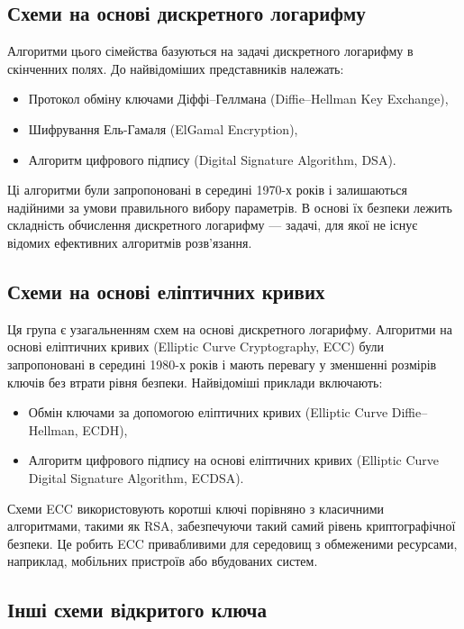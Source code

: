 \documentclass[12pt]{report}
\begin{document}
\subsection{Схеми на основі дискретного логарифму}

Алгоритми цього сімейства базуються на задачі дискретного логарифму в скінченних полях. До найвідоміших представників належать:
\begin{itemize}
    \item Протокол обміну ключами Діффі–Геллмана (Diffie–Hellman Key Exchange),
    \item Шифрування Ель-Гамаля (ElGamal Encryption),
    \item Алгоритм цифрового підпису (Digital Signature Algorithm, DSA).
\end{itemize}

Ці алгоритми були запропоновані в середині 1970-х років і залишаються надійними за умови правильного вибору параметрів. В основі їх безпеки лежить складність обчислення дискретного логарифму — задачі, для якої не існує відомих ефективних алгоритмів розв’язання.

\subsection{Схеми на основі еліптичних кривих}

Ця група є узагальненням схем на основі дискретного логарифму. Алгоритми на основі еліптичних кривих (Elliptic Curve Cryptography, ECC) були запропоновані в середині 1980-х років і мають перевагу у зменшенні розмірів ключів без втрати рівня безпеки. Найвідоміші приклади включають:
\begin{itemize}
    \item Обмін ключами за допомогою еліптичних кривих (Elliptic Curve Diffie–Hellman, ECDH),
    \item Алгоритм цифрового підпису на основі еліптичних кривих (Elliptic Curve Digital Signature Algorithm, ECDSA).
\end{itemize}

Схеми ECC використовують коротші ключі порівняно з класичними алгоритмами, такими як RSA, забезпечуючи такий самий рівень криптографічної безпеки. Це робить ECC привабливими для середовищ з обмеженими ресурсами, наприклад, мобільних пристроїв або вбудованих систем.

\subsection{Інші схеми відкритого ключа}
\end{document}
